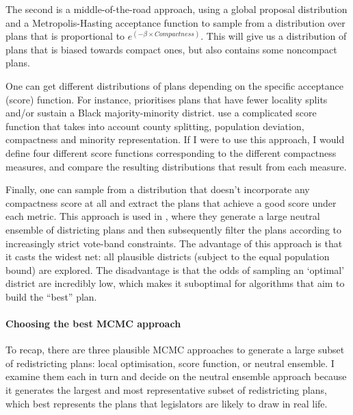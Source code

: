 \documentclass[]{article}
\let\oldparagraph\paragraph
\renewcommand{\paragraph}[1]{\oldparagraph{#1}\mbox{}}
\begin{document}
The second is a middle-of-the-road approach, using a global proposal
distribution and a Metropolis-Hasting acceptance function to sample from
a distribution over plans that is proportional to
\(e^{(-\beta \times Compactness)}\). This will give us a distribution of
plans that is biased towards compact ones, but also contains some
noncompact plans.

One can get different distributions of plans depending on the specific
acceptance (score) function. For instance, \cite{dd2019va} prioritises
plans that have fewer locality splits and/or sustain a Black
majority-minority district. \cite{h2018} use a complicated score
function that takes into account county splitting, population deviation,
compactness and minority representation. If I were to use this approach,
I would define four different score functions corresponding to the
different compactness measures, and compare the resulting distributions
that result from each measure.

Finally, one can sample from a distribution that doesn't incorporate any
compactness score at all and extract the plans that achieve a good score
under each metric. This approach is used in \cite{ddj2019comp}, where
they generate a large neutral ensemble of districting plans and then
subsequently filter the plans according to increasingly strict vote-band
constraints. The advantage of this approach is that it casts the widest
net: all plausible districts (subject to the equal population bound) are
explored. The disadvantage is that the odds of sampling an `optimal'
district are incredibly low, which makes it suboptimal for algorithms
that aim to build the ``best'' plan.

\hypertarget{choosing-the-best-mcmc-approach}{%
\paragraph{Choosing the best MCMC
approach}\label{choosing-the-best-mcmc-approach}}

To recap, there are three plausible MCMC approaches to generate a large
subset of redistricting plans: local optimisation, score function, or
neutral ensemble. I examine them each in turn and decide on the neutral
ensemble approach because it generates the largest and most
representative subset of redistricting plans, which best represents the
plans that legislators are likely to draw in real life.
\end{document}
